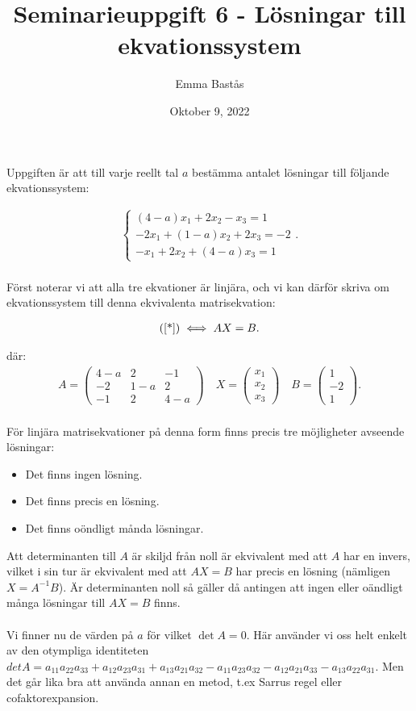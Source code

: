 \documentclass{article}
\title{Seminarieuppgift 6 - Lösningar till ekvationssystem}
\author{Emma Bastås}
\date{Oktober 9, 2022}
\begin{document}
\maketitle

\noindent Uppgiften är att till varje reellt tal $a$ bestämma antalet lösningar till följande ekvationssystem:

\begin{gather*}
  \begin{cases}
  (4 - a)x_{1} + 2x_{2} - x_{3} = 1\\
  -2x_{1} + (1 - a)x_{2} + 2x_{3} = -2\\
  -x_{1} + 2x_{2} + (4 - a)x_{3} = 1
  \end{cases}\text{.} \tag{$\star$}\label{*}
\end{gather*}
\\
Först noterar vi att alla tre ekvationer är linjära, och vi kan därför skriva om ekvationssystem till denna ekvivalenta matrisekvation:

\begin{gather*}
  \text{(\ref{*})} \iff AX = B\text{.}
\end{gather*}

där:
\begin{gather*}
  A =
  \begin{pmatrix}
    4 - a & 2 & - 1 \\
    -2 & 1 - a & 2 \\
    -1 & 2 & 4 - a
  \end{pmatrix}\quad
  X =
  \begin{pmatrix}
    x_{1} \\
    x_{2} \\
    x_{3}
  \end{pmatrix}\quad
  B =
  \begin{pmatrix}
    1 \\
    -2 \\
    1
  \end{pmatrix}\text{.}
\end{gather*}
\\
För linjära matrisekvationer på denna form finns precis tre möjligheter avseende lösningar:
\begin{itemize}
  \item Det finns ingen lösning.
  \item Det finns precis en lösning.
  \item Det finns oöndligt månda lösningar.
\end{itemize}

\noindent Att determinanten till $A$ är skiljd från noll är ekvivalent med att $A$ har en invers, vilket i sin tur är ekvivalent med att $AX = B$ har precis en lösning (nämligen $X = A^{-1}B$). Är determinanten noll så gäller då antingen att ingen eller oändligt många lösningar till $AX = B$ finns.
\\
\\
Vi finner nu de värden på $a$ för vilket $\det A = 0$. Här använder vi oss helt enkelt av den otympliga identiteten $det A = a_{11} a_{22} a_{33} + a_{12} a_{23} a_{31} + a_{13} a_{21} a_{32} - a_{11} a_{23} a_{32} - a_{12} a_{21} a_{33} - a_{13} a_{22} a_{31} $. Men det går lika bra att använda annan en metod, t.ex Sarrus regel eller cofaktorexpansion.
\end{document}
